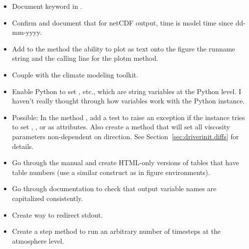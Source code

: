 \begin{itemize}
\item Document  keyword in .

\item Confirm and document that
	for netCDF output, time is model time since dd-mm-yyyy.

\item Add to the  method the ability to
	plot as text onto the figure the
	runname string and the calling line
	for the plotm method.

\item Couple with the
	{}
	climate modeling toolkit.

\item Enable Python to set , etc., which are string
	variables at the Python level.  I haven't really thought through
	how  variables work with the Python 
	instance.

\item Possible:  In the  method
	, add a test to raise an exception
	if the instance tries to set , ,
	or  as attributes.  Also create a method
	 that will set all viscosity parameters
	non-dependent on direction.  See Section~\ref{sec:driverinit.diffs}
	for details.

\item Go through the manual and create HTML-only versions of tables
	that have table numbers (use a similar construct as in
	figure environments).

\item Go through documentation to check that
	output variable names are capitalized consistently.

\item Create way to redirect stdout.

\item Create a step method to run an arbitrary number of timesteps at
	the atmosphere level.

\end{itemize}


